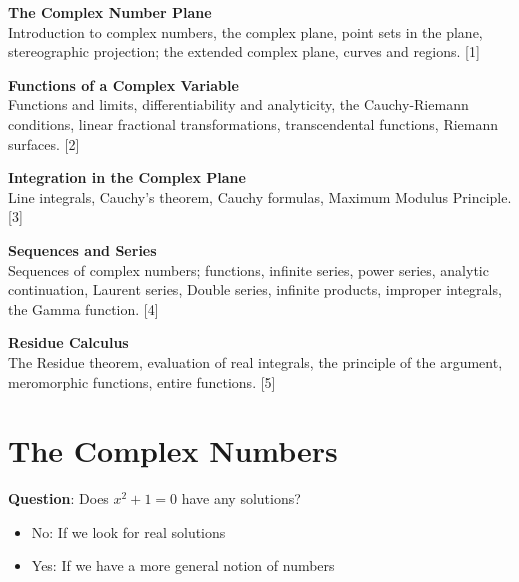 \documentclass{article}
\begin{document}
\maketitle
{\small
  \noindent\textbf{The Complex Number Plane}\\
  Introduction to complex numbers, the complex plane, point sets in the plane, stereographic projection; the extended complex plane, curves and regions.\hspace*{\fill} [1]

  \vspace{10pt}
  \noindent\textbf{Functions of a Complex Variable}\\
  Functions and limits, differentiability and analyticity, the Cauchy-Riemann conditions, linear fractional transformations, transcendental functions, Riemann surfaces.\hspace*{\fill} [2]

  \vspace{10pt}
  \noindent\textbf{Integration in the Complex Plane}\\
  Line integrals, Cauchy's theorem, Cauchy formulas, Maximum Modulus Principle.\hspace*{\fill} [3]

  \vspace{10pt}
  \noindent\textbf{Sequences and Series}\\
  Sequences of complex numbers; functions, infinite series, power series, analytic continuation, Laurent series, Double series, infinite products, improper integrals, the Gamma function.\hspace*{\fill} [4]

  \vspace{10pt}
  \noindent\textbf{Residue Calculus}\\
  The Residue theorem, evaluation of real integrals, the principle of the argument, meromorphic functions, entire functions.\hspace*{\fill} [5]
  }

\tableofcontents

\setcounter{section}{0}
\section{The Complex Numbers}

	\textbf{Question}: Does $x^2+1=0$ have any solutions?
	\begin{itemize}
		\item No: If we look for real solutions 
		\item Yes: If we have a more general notion of numbers
	\end{itemize}	
\end{document}
